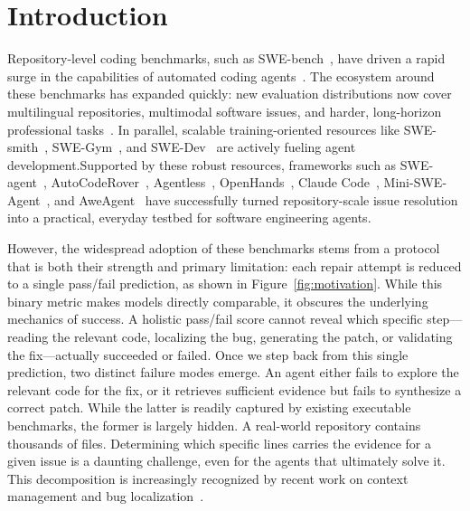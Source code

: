 \documentclass{llmxive}
\begin{document}
\section{Introduction}



Repository-level coding benchmarks, such as SWE-bench~\citep{jimenez2024swebench}, have driven a rapid surge in the capabilities of automated coding agents~\citep{chowdhury2024swebenchverified,zhang2025swebenchgoeslive,deng2025swebenchproaiagents}. The ecosystem around these benchmarks has expanded quickly: new evaluation distributions now cover multilingual repositories, multimodal software issues, and harder, long-horizon professional tasks~\citep{yang2025swesmith,zan2025multiswebenchmultilingualbenchmarkissue,yang2025swebench,badertdinov2025swerebenchautomatedpipelinetask}. In parallel, scalable training-oriented resources like SWE-smith~\citep{yang2025swesmith}, SWE-Gym~\citep{pan2025trainingsoftwareengineeringagents}, and SWE-Dev~\citep{wang2025swedev} are actively fueling agent development.Supported by these robust resources, frameworks such as SWE-agent~\citep{yang2024sweagent}, AutoCodeRover~\citep{zhang2024autocoderover}, Agentless~\citep{xia2024agentless}, OpenHands~\citep{wang2024openhands}, Claude Code~\citep{anthropic2025claudecode}, Mini-SWE-Agent~\citep{yang2024sweagent}, and AweAgent~\citep{chen2026beyondswecurrentcodeagent} have successfully turned repository-scale issue resolution into a practical, everyday testbed for software engineering agents.

However, the widespread adoption of these benchmarks stems from a protocol that is both their strength and primary limitation: each repair attempt is reduced to a single pass/fail prediction, as shown in Figure~\ref{fig:motivation}. While this binary metric makes models directly comparable, it obscures the underlying mechanics of success. A holistic pass/fail score cannot reveal which specific step---reading the relevant code, localizing the bug, generating the patch, or validating the fix---actually succeeded or failed. Once we step back from this single prediction, two distinct failure modes emerge. An agent either fails to explore the relevant code for the fix, or it retrieves sufficient evidence but fails to synthesize a correct patch. While the latter is readily captured by existing executable benchmarks, the former is largely hidden. A real-world repository contains thousands of files. Determining which specific lines carries the evidence for a given issue is a daunting challenge, even for the agents that ultimately solve it. This decomposition is increasingly recognized by recent work on context management and bug localization~\citep{li2026contextbench,chen2025locagent,yu2025orcaloca,wang2026swepruner,zhu2026swecontextbench,suri2026codescout}.
\end{document}
